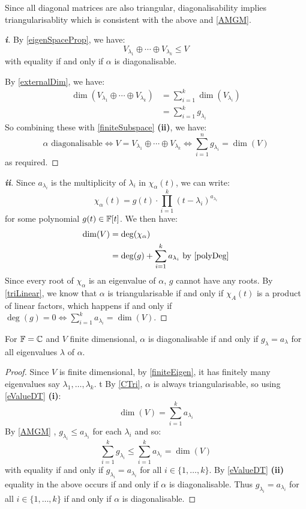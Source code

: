\documentclass[../main.tex]{subfiles}
\begin{document}
\begin{remark}
  Since all diagonal matrices are also triangular, diagonalisability implies triangularisablity which is consistent with the above and \cref{AMGM}.
\end{remark}
\begin{proof}[\textbf{i}]
  By \cref{eigenSpaceProp}, we have:
  \[
    V_{\lambda_1} \oplus \cdots \oplus V_{\lambda_k} \leq V
  \]
  with equality if and only if $\alpha$ is diagonalisable.

  By \cref{externalDim}, we have:
  \begin{align*}
    \dim(V_{\lambda_1} \oplus \cdots \oplus V_{\lambda_k}) &= \sum_{i = 1}^{k} \dim(V_{\lambda_i}) \\
                                                           &= \sum_{i = 1}^{k} g_{\lambda_i}
  \end{align*}
  So combining these with \cref{finiteSubspace} \textbf{(ii)}, we have:
  \[
    \alpha \text{ diagonalisable} \iff V = V_{\lambda_1} \oplus \cdots \oplus V_{\lambda_k} \iff \sum_{i = 1}^{n} g_{\lambda_i} = \dim(V)
  \]
  as required.
\end{proof}
\begin{proof}[\textbf{ii}]
  Since $a_{\lambda_i}$ is the multiplicity of $\lambda_i$ in $\chi_{\alpha}(t)$, we can write:
  \[
    \chi_{\alpha}(t) = g(t) \cdot \prod_{i = 1}^{k} (t - \lambda_i)^{a_{\lambda_i}}
  \]
  for some polynomial $g(t) \in \mathbb{F}[t]$.
  We then have:
  \begin{align*}
    \dim(V) &= \deg(\chi_{\alpha}) \\
            &= \deg(g) + \sum_{i = 1}^{k} a_{\lambda_i} \text{ by \cref{polyDeg}}
  \end{align*}
  Since every root of $\chi_{\alpha}$ is an eigenvalue of $\alpha$, $g$ cannot have any roots.
  By \cref{triLinear}, we know that $\alpha$ is triangularisable if and only if $\chi_{A}(t)$ is a product of linear factors, which happens if and only if $\deg(g) = 0 \iff \sum_{i = 1}^{k} a_{\lambda_i} = \dim(V)$.
\end{proof}
\begin{proposition}
  For $\mathbb{F} = \mathbb{C}$ and $V$ finite dimensional, $\alpha$ is diagonalisable if and only if $g_{\lambda} = a_{\lambda}$ for all eigenvalues $\lambda$ of $\alpha$. \label{CDiag}
\end{proposition}
\begin{proof}
  Since $V$ is finite dimensional, by \cref{finiteEigen}, it has finitely many eigenvalues say $\lambda_1, \ldots, \lambda_k$.
t By \cref{CTri}, $\alpha$ is always triangularisable, so using \cref{eValueDT} \textbf{(i)}:
  \[
    \dim(V) = \sum_{i = 1}^{k} a_{\lambda_i}
  \]
  By \cref{AMGM} , $g_{\lambda_i} \leq a_{\lambda_i}$ for each $\lambda_i$ and so:
  \[
    \sum_{i = 1}^{k} g_{\lambda_i} \leq \sum_{i = 1}^{k} a_{\lambda_i} = \dim(V)
  \]
  with equality if and only if $g_{\lambda_i} = a_{\lambda_i}$ for all $i \in \{1, \ldots, k\}$.
  By \cref{eValueDT} \textbf{(ii)} equality in the above occurs if and only if $\alpha$ is diagonalisable.
  Thus $g_{\lambda_i} = a_{\lambda_i}$ for all $i \in \{1, \ldots, k\}$ if and only if $\alpha$ is diagonalisable.
\end{proof}
\end{document}
